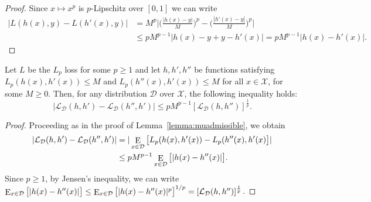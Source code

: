 \documentclass[twoside,11pt]{article}
\DeclareMathOperator*{\E}{\rm E}
\newcommand{\cD}{{\mathcal D}}
\newcommand{\cL}{{\mathcal L}}
\newcommand{\cX}{{\mathcal X}}
\newcommand{\1}{\mat{1}}
\begin{document}
\begin{proof}
Since $x \mapsto x^p$ is $p$-Lipschitz over $[0,1]$ we can write
\begin{align*}
| L(h(x),y) - L(h'(x), y) |
& = M^p \bigg|\Big(\frac{|h(x) - y|}{M}\Big)^p  -
\Big(\frac{|h'(x) - y|}{M}\Big)^p \bigg|\\
& \leq p M^{p-1}|h(x) - y + y - h'(x)|  = p M^{p-1} |h(x) - h'(x)|.
\end{align*}
\end{proof}

\begin{lemma}
\label{lemma:holder}
Let $L$ be the $L_p$ loss for some $p \geq 1$ and let $h, h', h''$ be
functions satisfying $L_p(h(x), h'(x)) \leq M$ and
$L_p(h''(x), h'(x)) \leq M$ for all $x \in \cX$, for some $M \geq 0$.
Then, for any distribution $\cD$ over $\cX$, the following inequality holds:
\begin{equation}
| \cL_\cD(h, h') - \cL_\cD(h'', h') | \leq p M^{p-1}[\cL_\cD(h, h'')]^{\frac{1}{p}}.
\end{equation}
\end{lemma}

\begin{proof}
Proceeding as in the proof of Lemma~\ref{lemma:muadmissible}, we obtain
\begin{align*}
| \cL_\cD(h, h') - \cL_\cD(h'', h') |
& = | \E_{x \in \cD}\big[L_p(h(x),
h'(x)) - L_p(h''(x), h'(x)\big]  |  \\
& \leq p M^{p-1} \E_{x \in \cD} \big[|h(x) - h''(x)| \big].
\end{align*}
Since $p \geq 1$, by Jensen's inequality, we can write $\E_{x \in \cD}
\big[|h(x) - h''(x)| \big] \leq \E_{x \in \cD} \big[|h(x) - h''(x)|^p
\big]^{1/p} = [\cL_\cD(h, h'')]^{\frac{1}{p}}$.
\end{proof}
%

\end{document}
